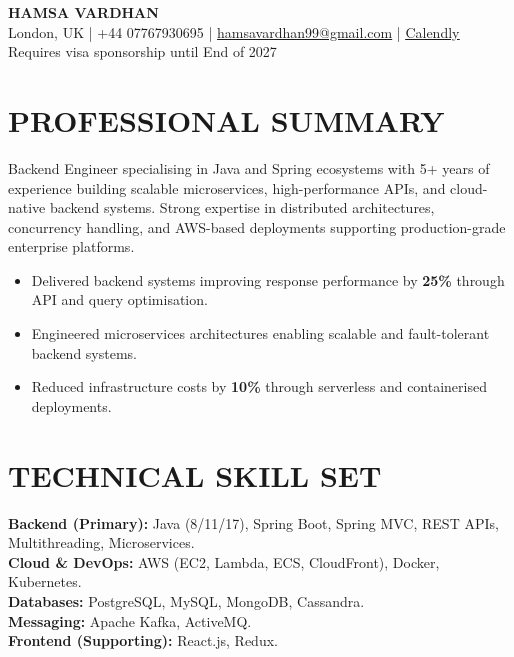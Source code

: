 \documentclass[11pt]{article}
\begin{document}
\begin{center}
{\LARGE \textbf{HAMSA VARDHAN}}\\
London, UK \;|\; +44 07767930695 \;|\;
\href{mailto:hamsavardhan99@gmail.com}{hamsavardhan99@gmail.com} \;|\; \href{https://calendly.com/hamsa-vd/intro-call}{\underline{Calendly}} \\
{\small Requires visa sponsorship until End of 2027}
\end{center}

\section*{PROFESSIONAL SUMMARY}

Backend Engineer specialising in Java and Spring ecosystems with 5+ years of experience building scalable microservices, high-performance APIs, and cloud-native backend systems. Strong expertise in distributed architectures, concurrency handling, and AWS-based deployments supporting production-grade enterprise platforms.

\begin{itemize}
    \item Delivered backend systems improving response performance by \textbf{25\%} through API and query optimisation.
    \item Engineered microservices architectures enabling scalable and fault-tolerant backend systems.
    \item Reduced infrastructure costs by \textbf{10\%} through serverless and containerised deployments.
\end{itemize}

\section*{TECHNICAL SKILL SET}

\textbf{Backend (Primary):} Java (8/11/17), Spring Boot, Spring MVC, REST APIs, Multithreading, Microservices.\\
\textbf{Cloud \& DevOps:} AWS (EC2, Lambda, ECS, CloudFront), Docker, Kubernetes.\\
\textbf{Databases:} PostgreSQL, MySQL, MongoDB, Cassandra.\\
\textbf{Messaging:} Apache Kafka, ActiveMQ.\\
\textbf{Frontend (Supporting):} React.js, Redux.\\

\end{document}
